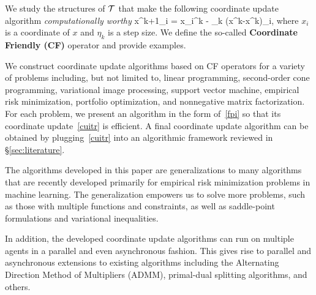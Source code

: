 We study the structures of ${\mathcal{T}}$ that make the  following coordinate update algorithm \emph{computationally worthy}
\beq\label{cuitr}
x^{k+1}_i = x_i^k - \eta_k (x^k-\cT x^k)_i,
\eeq
where $x_i$ is a coordinate of $x$ and $\eta_k$ is a  step size. We define the so-called \textbf{Coordinate Friendly (CF)} operator and provide examples. 

We construct coordinate update algorithms based on CF operators for a variety of problems including, but not limited to, linear programming, second-order cone programming, variational image processing, support vector machine, empirical risk minimization, portfolio optimization, and nonnegative matrix factorization. For each problem, we present an algorithm in the form of~\eqref{fpi} so that its coordinate update~\eqref{cuitr} is efficient. A final coordinate update algorithm can be obtained by plugging~\eqref{cuitr} into an algorithmic framework reviewed in \S\ref{sec:literature}. 

The algorithms developed in this paper are generalizations to many algorithms that are recently developed primarily for empirical risk minimization problems in machine learning. %
The generalization empowers us to solve more problems, such as those with multiple functions and constraints, as well as saddle-point formulations and variational inequalities.


In addition, the developed coordinate update algorithms can run on multiple agents in a parallel and even asynchronous fashion. This gives rise to parallel and asynchronous extensions to  existing algorithms including the Alternating Direction Method of Multipliers (ADMM), primal-dual splitting algorithms, and others.

